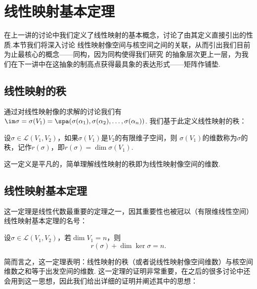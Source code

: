\chapter{线性映射基本定理}

在上一讲的讨论中我们定义了线性映射的基本概念，讨论了由其定义直接引出的性质.本节我们将深入讨论
线性映射像空间与核空间之间的关联，从而引出我们目前为止最核心的概念——同构，因为同构使得我们研究
的抽象层次更上一层，为我们在下一讲中在这抽象的制高点获得最具象的表达形式——矩阵作铺垫.

\section{线性映射的秩}
通过对线性映射像的求解的讨论我们有
$\im \sigma=\sigma(V_1)=\spa(\sigma(\alpha_1),\sigma(\alpha_2),\ldots,\sigma(\alpha_n))$.
我们基于此定义线性映射的秩：
\begin{definition}
    设$\sigma\in \mathcal{L}(V_1,V_2)$，如果$\sigma(V_1)$是$V_2$的有限维子空间，则
    $\sigma(V_1)$的维数称为$\sigma$的秩，记作$r(\sigma)$，即$r(\sigma)=\dim \sigma(V_1)$.
\end{definition}

这一定义是平凡的，简单理解线性映射的秩即为线性映射像空间的维数.

\section{线性映射基本定理}
这一定理是线性代数最重要的定理之一，因其重要性也被冠以（有限维线性空间）线性映射基本定理的名号：
\begin{theorem}\label{thm:6:线性映射基本定理}
    设$\sigma \in \mathcal{L}(V_1,V_2)$，若$\dim V_1=n$，则
    \[r(\sigma)+\dim\ker\sigma=n.\]
\end{theorem}
简而言之，这一定理表明：线性映射的秩（或者说线性映射像空间维数）与核空间维数之和等于出发空间的维数.
这一定理的证明非常重要，在之后的很多讨论中还会用到这一思想，因此我们给出详细的证明并阐述其中的思想：

